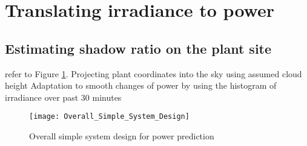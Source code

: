 \section{Translating irradiance to power}
\subsection{Estimating shadow ratio on the plant site}
refer to Figure \ref{fig:overall_system_design_power}.
Projecting plant coordinates into the sky using assumed cloud height
Adaptation to smooth changes of power by using the histogram of irradiance over past 30 minutes
\begin{figure}[h]
\caption{Overall simple system design for power prediction}
\label{fig:overall_system_design_power}
\texttt{[image: Overall\_Simple\_System\_Design]}
\centering
\end{figure}
